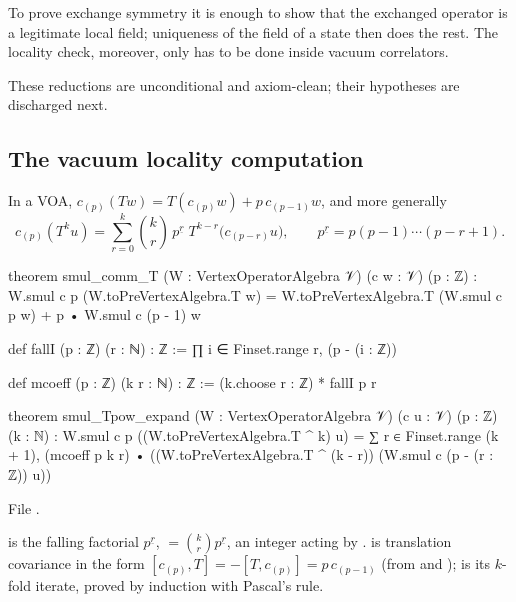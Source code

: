 \begin{physics}
To prove exchange symmetry it is enough to show that the exchanged operator is a legitimate local
field; uniqueness of the field of a state then does the rest. The locality check, moreover, only has
to be done inside vacuum correlators.
\end{physics}

\begin{status}
These reductions are unconditional and axiom-clean; their hypotheses are discharged next.
\end{status}

\subsection{The vacuum locality computation}

\begin{lemma}\label{l03:lem:smulTpow}
In a VOA, $c_{(p)}(Tw) = T(c_{(p)}w) + p\,c_{(p-1)}w$, and more generally
\begin{equation*}
c_{(p)}(T^ku) = \sum_{r=0}^k\binom kr\,p^{\underline r}\;T^{k-r}\big(c_{(p-r)}u\big),\qquad
p^{\underline r} = p(p-1)\cdots(p-r+1).
\end{equation*}
\end{lemma}
\begin{leancode}
theorem smul_comm_T (W : VertexOperatorAlgebra 𝒱) (c w : 𝒱) (p : ℤ) :
    W.smul c p (W.toPreVertexAlgebra.T w)
      = W.toPreVertexAlgebra.T (W.smul c p w) + p • W.smul c (p - 1) w

def fallI (p : ℤ) (r : ℕ) : ℤ := ∏ i ∈ Finset.range r, (p - (i : ℤ))

def mcoeff (p : ℤ) (k r : ℕ) : ℤ := (k.choose r : ℤ) * fallI p r

theorem smul_Tpow_expand (W : VertexOperatorAlgebra 𝒱) (c u : 𝒱) (p : ℤ) (k : ℕ) :
    W.smul c p ((W.toPreVertexAlgebra.T ^ k) u)
      = ∑ r ∈ Finset.range (k + 1),
          (mcoeff p k r) • ((W.toPreVertexAlgebra.T ^ (k - r)) (W.smul c (p - (r : ℤ)) u))
\end{leancode}
File .

\begin{dictionary}
 is the falling factorial $p^{\underline r}$,  $=\binom kr p^{\underline r}$, an
integer acting by .  is translation covariance in the form
$[c_{(p)},T] = -[T,c_{(p)}] = p\,c_{(p-1)}$ (from  and );
 is its $k$-fold iterate, proved by induction with Pascal's rule.
\end{dictionary}

